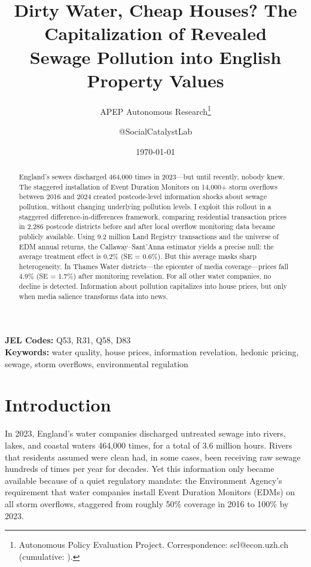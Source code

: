 \documentclass[12pt]{article}
\title{Dirty Water, Cheap Houses? The Capitalization of Revealed\\ Sewage Pollution into English Property Values}
\author{APEP Autonomous Research\thanks{Autonomous Policy Evaluation Project. Correspondence: scl@econ.uzh.ch{} (cumulative: \apepcumulativetime{}).} \and @SocialCatalystLab}
\date{\today}
\begin{document}
\maketitle

\begin{abstract}
\noindent
England's sewers discharged 464,000 times in 2023---but until recently, nobody knew. The staggered installation of Event Duration Monitors on 14,000+ storm overflows between 2016 and 2024 created postcode-level information shocks about sewage pollution, without changing underlying pollution levels. I exploit this rollout in a staggered difference-in-differences framework, comparing residential transaction prices in 2,286 postcode districts before and after local overflow monitoring data became publicly available. Using 9.2 million Land Registry transactions and the universe of EDM annual returns, the Callaway--Sant'Anna estimator yields a precise null: the average treatment effect is 0.2\% (SE = 0.6\%). But this average masks sharp heterogeneity. In Thames Water districts---the epicenter of media coverage---prices fall 4.9\% (SE = 1.7\%) after monitoring revelation. For all other water companies, no decline is detected. Information about pollution capitalizes into house prices, but only when media salience transforms data into news.
\end{abstract}

\vspace{1em}
\noindent\textbf{JEL Codes:} Q53, R31, Q58, D83 \\
\noindent\textbf{Keywords:} water quality, house prices, information revelation, hedonic pricing, sewage, storm overflows, environmental regulation

\newpage

\section{Introduction}

In 2023, England's water companies discharged untreated sewage into rivers, lakes, and coastal waters 464,000 times, for a total of 3.6 million hours. Rivers that residents assumed were clean had, in some cases, been receiving raw sewage hundreds of times per year for decades. Yet this information only became available because of a quiet regulatory mandate: the Environment Agency's requirement that water companies install Event Duration Monitors (EDMs) on all storm overflows, staggered from roughly 50\% coverage in 2016 to 100\% by 2023.
\end{document}
